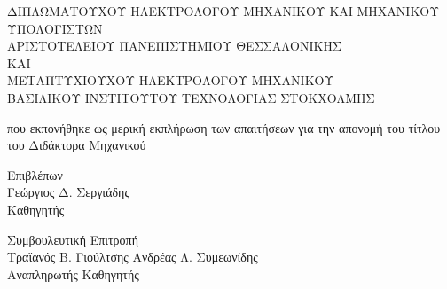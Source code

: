 \begin{center}
   \vspace{0.5cm}

   {\footnotesize ΔΙΠΛΩΜΑΤΟΥΧΟΥ ΗΛΕΚΤΡΟΛΟΓΟΥ ΜΗΧΑΝΙΚΟΥ ΚΑΙ ΜΗΧΑΝΙΚΟΥ ΥΠΟΛΟΓΙΣΤΩΝ\\}
   {\footnotesize ΑΡΙΣΤΟΤΕΛΕΙΟΥ ΠΑΝΕΠΙΣΤΗΜΙΟΥ ΘΕΣΣΑΛΟΝΙΚΗΣ\\}
   {\footnotesize ΚΑΙ\\}
   {\footnotesize ΜΕΤΑΠΤΥΧΙΟΥΧΟΥ ΗΛΕΚΤΡΟΛΟΓΟΥ ΜΗΧΑΝΙΚΟΥ\\}
   {\footnotesize ΒΑΣΙΛΙΚΟΥ ΙΝΣΤΙΤΟΥΤΟΥ ΤΕΧΝΟΛΟΓΙΑΣ ΣΤΟΚΧΟΛΜΗΣ\\}

   \vspace{1.0cm}

   {που εκπονήθηκε ως μερική εκπλήρωση των απαιτήσεων για την απονομή του
   τίτλου του Διδάκτορα Μηχανικού}

   \vspace{1.8cm}

   {Επιβλέπων\\}
   \vspace{-0.2cm}
   {Γεώργιος Δ. Σεργιάδης\\}
   \vspace{-0.2cm}
   {Καθηγητής}

   \vspace{0.7cm}

   {Συμβουλευτική Επιτροπή\\}
   {Τραϊανός Β. Γιούλτσης} \hspace{5cm} {Ανδρέας Λ. Συμεωνίδης\\}
   \vspace{-0.2cm}
   \hspace{1.2cm}{Καθηγητής}             \hspace{5.8cm} {Αναπληρωτής Καθηγητής}

\end{center}
